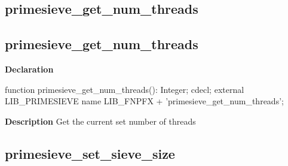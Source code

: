 \documentclass{report}
\newif\ifpdf
\begin{document}
\subsection*{\large{\textbf{primesieve{\_}get{\_}num{\_}threads}}\normalsize\hspace{1ex}\hrulefill}
\else
\subsection*{primesieve{\_}get{\_}num{\_}threads}
\fi
\label{primesieve-primesieve_get_num_threads}
\begin{list}{}{
\setlength{\itemindent}{0cm}
\setlength{\listparindent}{0cm}
\setlength{\leftmargin}{\evensidemargin}
\addtolength{\leftmargin}{\tmplength}
\settowidth{\labelsep}{X}
\addtolength{\leftmargin}{\labelsep}
\setlength{\labelwidth}{\tmplength}
}
\item[\textbf{Declaration}\hfill]
\ifpdf
\begin{flushleft}
\fi
\begin{ttfamily}
function primesieve{\_}get{\_}num{\_}threads(): Integer; cdecl; external LIB{\_}PRIMESIEVE name LIB{\_}FNPFX + 'primesieve{\_}get{\_}num{\_}threads';\end{ttfamily}

\ifpdf
\end{flushleft}
\fi

\par
\item[\textbf{Description}]
Get the current set number of threads

\end{list}
\ifpdf
\subsection*{\large{\textbf{primesieve{\_}set{\_}sieve{\_}size}}\normalsize\hspace{1ex}\hrulefill}
\else
\end{document}
